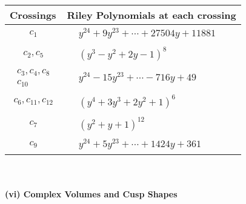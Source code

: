 \documentclass[1p]{elsarticle_modified}
\theoremstyle{definition}
\begin{document}
\begin{tabular}{m{50pt}|m{274pt}}
Crossings & \hspace{64pt}Riley Polynomials at each crossing \\
\hline $$\begin{aligned}c_{1}\end{aligned}$$&$\begin{aligned}
&y^{24}+9 y^{23}+\cdots+27504 y+11881
\end{aligned}$\\
\hline $$\begin{aligned}c_{2},c_{5}\end{aligned}$$&$\begin{aligned}
&(y^3- y^2+2 y-1)^8
\end{aligned}$\\
\hline $$\begin{aligned}c_{3},c_{4},c_{8}\\c_{10}\end{aligned}$$&$\begin{aligned}
&y^{24}-15 y^{23}+\cdots-716 y+49
\end{aligned}$\\
\hline $$\begin{aligned}c_{6},c_{11},c_{12}\end{aligned}$$&$\begin{aligned}
&(y^4+3 y^3+2 y^2+1)^6
\end{aligned}$\\
\hline $$\begin{aligned}c_{7}\end{aligned}$$&$\begin{aligned}
&(y^2+y+1)^{12}
\end{aligned}$\\
\hline $$\begin{aligned}c_{9}\end{aligned}$$&$\begin{aligned}
&y^{24}+5 y^{23}+\cdots+1424 y+361
\end{aligned}$\\
\hline
\end{tabular}\\~\\
\newpage\flushleft \textbf{(vi) Complex Volumes and Cusp Shapes}
\end{document}
